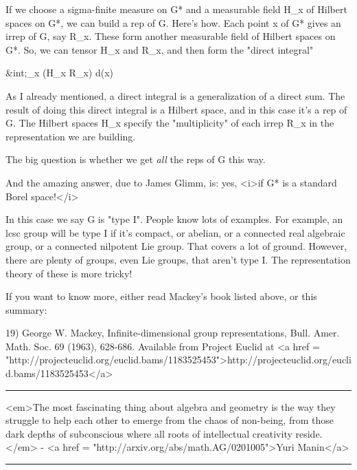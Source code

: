 If we choose a sigma-finite measure \mu  on G* and a measurable field
H_{x} of Hilbert spaces on G*, we can build a rep of G.
Here's how.  Each point x of G* gives an irrep of G, say
R_{x}.  These form another measurable field of Hilbert spaces
on G*.  So, we can tensor H_{x} and R_{x}, and then
form the "direct integral"

&int;_{x}  (H_{x} \otimes  R_{x}) d\mu (x)

As I already mentioned, a direct integral is a generalization of a
direct sum.  The result of doing this direct integral is a Hilbert
space, and in this case it's a rep of G.  The Hilbert spaces
H_{x} specify the "multiplicity" of each irrep
R_{x} in the representation we are building.

The big question is whether we get \emph{all} the reps of G this way.

And the amazing answer, due to James Glimm, is: yes, <i>if G* is a
standard Borel space!</i>

In this case we say G is "type I".  People know lots of
examples.  For example, an lcsc group will be type I if it's compact,
or abelian, or a connected real algebraic group, or a connected
nilpotent Lie group.  That covers a lot of ground.  However, there are
plenty of groups, even Lie groups, that aren't type I.  The
representation theory of these is more tricky!

If you want to know more, either read Mackey's book listed above, 
or this summary:

19) George W. Mackey, Infinite-dimensional group representations,
Bull. Amer. Math. Soc. 69 (1963), 628-686.  Available from Project
Euclid at <a href =
"http://projecteuclid.org/euclid.bams/1183525453">http://projecteuclid.org/euclid.bams/1183525453</a>

\par\noindent\rule{\textwidth}{0.4pt}

<em>The most fascinating thing about algebra and geometry is the way 
they struggle to help each other to emerge from the chaos of non-being, 
from those dark depths of subconscious where all roots of intellectual 
creativity reside.</em> - <a href = "http://arxiv.org/abs/math.AG/0201005">Yuri
Manin</a>

\par\noindent\rule{\textwidth}{0.4pt}


